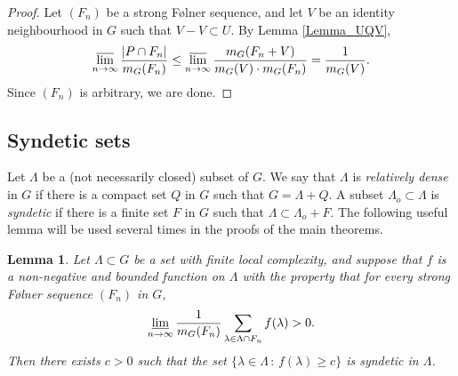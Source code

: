 \documentclass[12pt,reqno,a4paper]{amsart}
\numberwithin{equation}{section}
\newcommand{\ra}{\rightarrow}
\theoremstyle{theorem}
\newtheorem{lemma}[theorem]{Lemma}
\theoremstyle{task}
\theoremstyle{definition}
\begin{document}
\begin{proof}
Let $(F_n)$ be a strong F\o lner sequence, and let $V$
be an identity neighbourhood in $G$ such that $V-V \subset U$. By Lemma \ref{Lemma_UQV}, 
\[
\varlimsup_{n \ra \infty}
\frac{|P \cap F_n|}{m_G(F_n)} \leq \varlimsup_{n \ra \infty}
\frac{m_G(F_n+V)}{m_G(V) \cdot m_G(F_n)} = \frac{1}{m_G(V)}.
\]
Since $(F_n)$ is arbitrary, we are done.
\end{proof}

\subsection{Syndetic sets}

Let $\Lambda$ be a (not necessarily closed) subset of $G$. We say that $\Lambda$ is
\emph{relatively dense} in $G$ if there is a compact set $Q$ in $G$ such that 
$G = \Lambda + Q$. A subset $\Lambda_o \subset \Lambda$ is \emph{syndetic} if there
is a finite set $F$ in $G$ such that $\Lambda \subset \Lambda_o +  F$. The following useful lemma will be used several times in the proofs of the main theorems.

\begin{lemma}
\label{Lemma_syndfromav}
Let $\Lambda \subset G$ be a set with finite local complexity, and suppose that 
$f$ is a non-negative and bounded function on $\Lambda$ with the property that for every strong F\o lner sequence $(F_n)$ in $G$, 
\[
\varliminf_{n \ra \infty} \frac{1}{m_G(F_n)} \sum_{\lambda \in \Lambda \cap F_n} f(\lambda) > 0.
\]
Then there exists $c > 0$ such that the set $\{\lambda \in \Lambda \, : \, f(\lambda) \geq c\}$
is syndetic in $\Lambda$.
\end{lemma}
\end{document}
